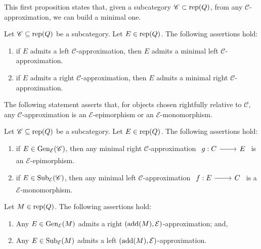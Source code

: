 This first proposition states that, given a subcategory $\mathscr{C} \subset \operatorname{rep}(Q)$, from any $\mathscr{C}$-approximation, we can build a minimal one.

\begin{prop} \label{prop:Approxismonoepi}
    Let $\mathscr{C} \subseteq \operatorname{rep}(Q)$ be a subcategory. Let $E \in \operatorname{rep}(Q)$. The following assertions hold:
    \begin{enumerate}[label=$(\roman*)$, itemsep=1mm]
        \item if $E$ admits a left $\mathscr{C}$-approximation, then $E$ admits a minimal left $\mathscr{C}$-approximation.
        \item if $E$ admits a right $\mathscr{C}$-approximation, then $E$ admits a minimal right $\mathscr{C}$-approximation.
    \end{enumerate}
\end{prop}

The following statement asserts that, for objects chosen rightfully relative to $\mathscr{C}$, any $\mathscr{C}$-approximation is an $\mathcal{E}$-epimorphism or an $\mathcal{E}$-monomorphism.

\begin{prop} \label{prop:Approxismonoepi2}
Let $\mathscr{C} \subseteq \operatorname{rep}(Q)$ be a subcategory. Let $E \in \operatorname{rep}(Q)$. The following assertions hold:
    \begin{enumerate}[label=$(\roman*)$, itemsep=1mm]
        \item if $E \in \operatorname{Gen}_\mathcal{E}(\mathscr{C})$, then any minimal right $\mathscr{C}$-approximation $\begin{tikzcd}
	g: C & E
	\arrow[from=1-1, to=1-2]
        \end{tikzcd}$ is an $\mathcal{E}$-epimorphism.
        \item if $E \in \operatorname{Sub}_\mathcal{E}(\mathscr{C})$, then any minimal left $\mathscr{C}$-approximation $\begin{tikzcd}
	f: E & C
	\arrow[from=1-1, to=1-2]
        \end{tikzcd}$ is a $\mathcal{E}$-monomorphism.
    \end{enumerate}
\end{prop}


\begin{lemma} \label{lem:TiltandApprox} Let $M \in \operatorname{rep} (Q)$. The following assertions hold:
\begin{enumerate}[label=$(\roman*)$, itemsep=1mm]
    \item \label{GenET2} Any $E \in \operatorname{Gen}_\mathcal{E}(M)$ admits a right $(\operatorname{add}(M), \mathcal{E})$-approximation; and,
    \item \label{SubET2} Any $E \in \operatorname{Sub}_\mathcal{E}(M)$ admits a left $(\operatorname{add}(M),\mathcal{E})$-approximation. 
\end{enumerate}
\end{lemma}


